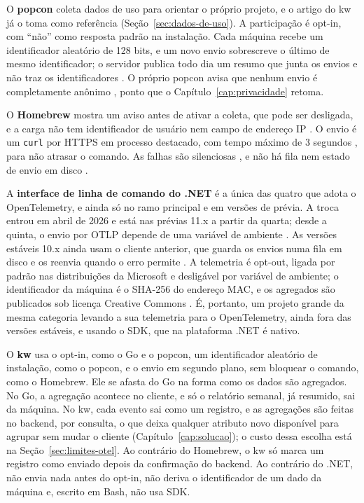 O \textbf{popcon} coleta dados de uso para orientar o próprio projeto, e o
artigo do kw já o toma como referência (Seção~\ref{sec:dados-de-uso}). A
participação é opt-in, com \enquote{não} como resposta padrão na instalação.
Cada máquina recebe um identificador aleatório de 128 bits, e um novo envio
sobrescreve o último de mesmo identificador; o servidor publica todo dia um
resumo que junta os envios e não traz os identificadores
\citep{popcon_package_1_78}. O próprio popcon avisa que nenhum envio é
completamente anônimo \citep{popcon_package_1_78}, ponto que o
Capítulo~\ref{cap:privacidade} retoma.

O \textbf{Homebrew} mostra um aviso antes de ativar a coleta, que pode ser
desligada, e a carga não tem identificador de usuário nem campo de endereço IP
\citep{brew_analytics}. O envio é um \texttt{curl} por HTTPS em processo
destacado, com tempo máximo de 3 segundos \citep{brew_analytics_code}, para
não atrasar o comando. As falhas são silenciosas \citep{brew_analytics}, e não
há fila nem estado de envio em disco \citep{brew_analytics_code}.

A \textbf{interface de linha de comando do .NET} é a única das quatro que adota o
OpenTelemetry, e ainda só no ramo principal e em versões de prévia. A troca
entrou em abril de 2026 \citep{dotnet_sdk_pr_53181} e está nas prévias 11.x a
partir da quarta; desde a quinta, o envio por OTLP depende de uma variável de
ambiente \citep{dotnet_sdk_telemetryclient_rc3}. As versões estáveis 10.x
ainda usam o cliente anterior, que guarda os envios numa fila em disco e os
reenvia quando o erro permite \citep{dotnet_sdk_v10_0_404}. A telemetria é
opt-out, ligada por padrão nas distribuições da Microsoft e desligável por
variável de ambiente; o identificador da máquina é o SHA-256 do endereço MAC,
e os agregados são publicados sob licença Creative Commons
\citep{dotnet_cli_telemetry}. É, portanto, um projeto grande da mesma
categoria levando a sua telemetria para o OpenTelemetry, ainda fora das
versões estáveis, e usando o SDK, que na plataforma .NET é nativo.

O \textbf{kw} usa o opt-in, como o Go e o popcon, um identificador aleatório
de instalação, como o popcon, e o envio em segundo plano, sem bloquear o
comando, como o Homebrew. Ele se afasta do Go na forma como os dados são
agregados. No Go, a agregação acontece no cliente, e só o relatório semanal,
já resumido, sai da máquina. No kw, cada evento sai como um registro, e as
agregações são feitas no backend, por consulta, o que deixa qualquer atributo
novo disponível para agrupar sem mudar o cliente (Capítulo~\ref{cap:solucao});
o custo dessa escolha está na Seção~\ref{sec:limites-otel}. Ao contrário do
Homebrew, o kw só marca um registro como enviado depois da confirmação do
backend. Ao contrário do .NET, não envia nada antes do opt-in, não deriva o
identificador de um dado da máquina e, escrito em Bash, não usa SDK.

